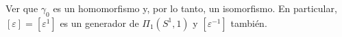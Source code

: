 \begin{ejercicio}
Ver que $\gamma_0$ es un homomorfismo y, por lo tanto, un isomorfismo. En particular, $[\varepsilon] = [\varepsilon^1]$ es un generador de $\Pi_1(S^1, 1)$ y $[\varepsilon^{-1}]$ también.
\end{ejercicio}

\begin{demostracion}

\end{demostracion}

